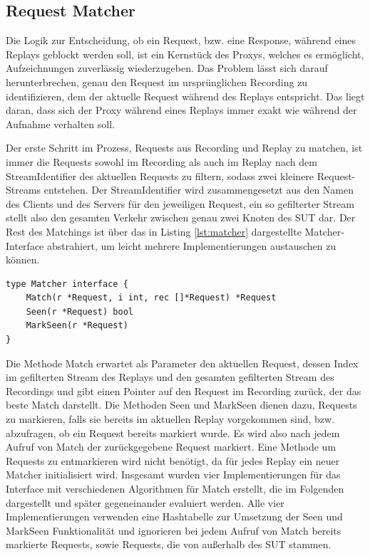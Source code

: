 \documentclass[12pt,a4paper]{report}
\begin{document}
\subsection{Request Matcher}
\label{chap:matcher}
Die Logik zur Entscheidung, ob ein Request, bzw. eine Response, während eines Replays geblockt werden soll,
ist ein Kernstück des Proxys, welches es ermöglicht, Aufzeichnungen zuverlässig wiederzugeben.
Das Problem lässt sich darauf herunterbrechen, genau den Request im ursprünglichen Recording zu identifizieren,
dem der aktuelle Request während des Replays entspricht. Das liegt daran, dass sich der Proxy während eines
Replays immer exakt wie während der Aufnahme verhalten soll.

Der erste Schritt im Prozess, Requests aus Recording und Replay zu matchen, ist immer die Requests sowohl im Recording als auch im
Replay nach dem Stream\-Identifier des aktuellen Requests zu filtern, sodass zwei kleinere Request-Streams entstehen. Der
StreamIdentifier wird zusammengesetzt aus den Namen des Clients und des Servers für den jeweiligen Request, ein so gefilterter
Stream stellt also den gesamten Verkehr zwischen genau zwei Knoten des SUT dar. Der Rest des Matchings ist über das in Listing
\ref{lst:matcher} dargestellte Matcher-Interface abstrahiert, um leicht mehrere Implementierungen austauschen zu können.
\begin{lstlisting}[caption={Das Matcher-Interface in ditm}, label={lst:matcher}]
type Matcher interface {
   	Match(r *Request, i int, rec []*Request) *Request
   	Seen(r *Request) bool
    MarkSeen(r *Request)
}
\end{lstlisting}
Die Methode Match erwartet als Parameter den aktuellen Request, dessen Index im gefilterten Stream des Replays
und den gesamten gefilterten Stream des Recordings und gibt einen Pointer auf den Request im Recording zurück,
der das beste Match darstellt. Die Methoden Seen und MarkSeen dienen dazu, Requests zu markieren, falls sie bereits
im aktuellen Replay vorgekommen sind, bzw. abzufragen, ob ein Request bereits markiert wurde. Es wird also nach jedem Aufruf
von Match der zurückgegebene Request markiert. Eine Methode um Requests zu entmarkieren wird nicht benötigt, da für
jedes Replay ein neuer Matcher initialisiert wird. Insgesamt wurden vier Implementierungen für das Interface mit
verschiedenen Algorithmen für Match erstellt, die im Folgenden dargestellt und später gegeneinander evaluiert werden.
Alle vier Implementierungen verwenden eine Hashtabelle zur Umsetzung der Seen und MarkSeen Funktionalität und ignorieren
bei jedem Aufruf von Match bereits markierte Requests, sowie Requests, die von außerhalb des SUT stammen.
\end{document}
